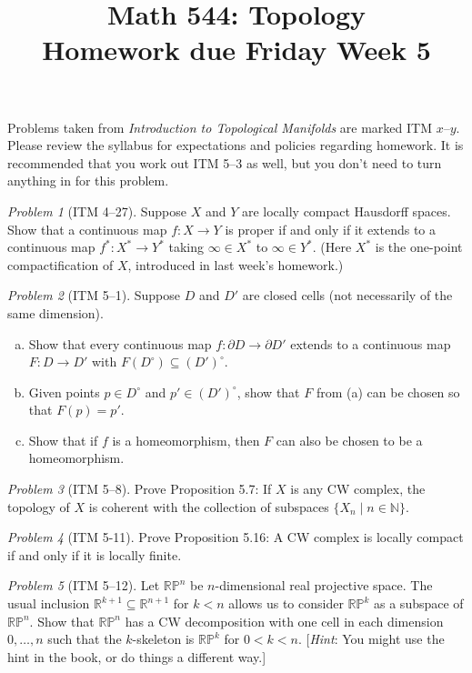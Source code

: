 \documentclass[11pt,twoside]{amsart}
\title{Math 544: Topology\\ Homework due Friday Week 5}
\theoremstyle{plain}
\theoremstyle{remark}
\newtheorem{prob}{Problem}
\theoremstyle{definition}
\theoremstyle{definition}
\newcommand{\RR}{\mathbb{R}}
\newcommand{\NN}{\mathbb{N}}
\begin{document}
\maketitle

\noindent Problems taken from \emph{Introduction to Topological Manifolds} are marked ITM $x$--$y$. Please review the syllabus for expectations and policies regarding homework. It is recommended that you work out ITM 5--3 as well, but you don't need to turn anything in for this problem.

\begin{prob}[ITM 4--27]
Suppose $X$ and $Y$ are locally compact Hausdorff spaces. Show that a continuous map $f\colon X\to Y$ is proper if and only if it extends to a continuous map $f^*\colon X^*\to Y^*$ taking $\infty\in X^*$ to $\infty\in Y^*$. (Here $X^*$ is the one-point compactification of $X$, introduced in last week's homework.)
\end{prob}

\begin{prob}[ITM 5--1]
Suppose $D$ and $D'$ are closed cells (not necessarily of the same dimension).
\begin{enumerate}[(a)]
\item Show that every continuous map $f\colon \partial D\to \partial D'$ extends to a continuous map $F\colon D\to D'$ with $F(D^\circ)\subseteq (D')^\circ$.
\item Given points $p\in D^\circ$ and $p'\in (D')^\circ$, show that $F$ from (a) can be chosen so that $F(p)=p'$.
\item Show that if $f$ is a homeomorphism, then $F$ can also be chosen to be a homeomorphism.
\end{enumerate}
\end{prob}

\begin{prob}[ITM 5--8]
Prove Proposition 5.7: If $X$ is any CW complex, the topology of $X$ is coherent with the collection of subspaces $\{X_n \mid n\in \NN\}$.
\end{prob}

\begin{prob}[ITM 5-11]
Prove Proposition 5.16: A CW complex is locally compact if and only if it is locally finite.
\end{prob}

\begin{prob}[ITM 5--12]
Let $\mathbb{RP}^n$ be $n$-dimensional real projective space. The usual inclusion $\RR^{k+1}\subseteq \RR^{n+1}$ for $k<n$ allows us to consider $\mathbb{RP}^k$ as a subspace of $\mathbb{RP}^n$. Show that $\mathbb{RP}^n$ has a CW decomposition with one cell in each dimension $0,\ldots,n$ such that the $k$-skeleton is $\mathbb{RP}^k$ for $0<k<n$. [\emph{Hint}: You might use the hint in the book, or do things a different way.]
\end{prob}
\end{document}
